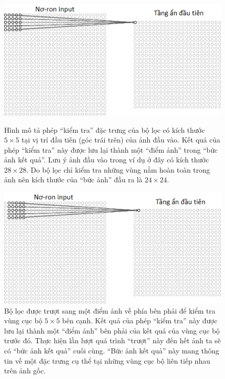	\begin{figure}
		\centering
		\includegraphics[width=.8\textwidth]{cnn_first_filter}
		\caption[Phép tính đặc trưng của CNN]{Hình mô tả phép ``kiểm tra'' đặc trưng của bộ lọc có kích thước $5\times5$ tại vị trí đầu tiên (góc trái trên) của ảnh đầu vào.
		Kết quả của phép ``kiểm tra'' này được lưu lại thành một ``điểm ảnh'' trong ``bức ảnh kết quả''.
		Lưu ý ảnh đầu vào trong ví dụ ở đây có kích thước $28\times28$.
		Do bộ lọc chỉ kiểm tra những vùng nằm hoàn toàn trong ảnh nên kích thước của ``bức ảnh'' đầu ra là $24\times24$.}
		\label{fig_cnn_filter}
		
		\includegraphics[width=.8\textwidth]{cnn_second_filter}
		\caption[Phép dịch chuyển bộ lọc của CNN]{Bộ lọc được trượt sang một điểm ảnh về phía bên phải để kiểm tra vùng cục bộ $5\times5$ bên cạnh.
		Kết quả của phép ``kiểm tra'' này được lưu lại thành một ``điểm ảnh'' bên phải của kết quả của vùng cục bộ trước đó.
		Thực hiện lần lượt quá trình ``trượt'' này đến hết ảnh ta sẽ có ``bức ảnh kết quả'' cuối cùng.
		``Bức ảnh kết quả'' này mang thông tin về một đặc trưng cụ thể tại những vùng cục bộ liên tiếp nhau trên ảnh gốc.}
		\label{fig_cnn_second_filter}	
	\end{figure}
	
